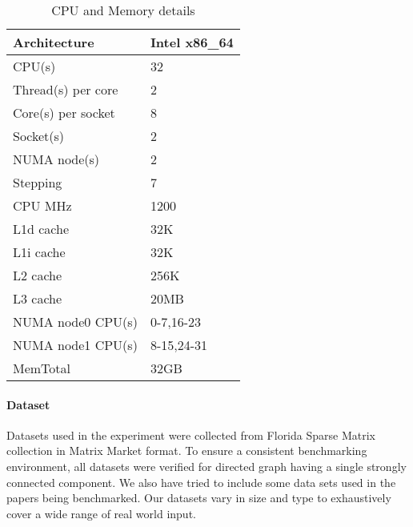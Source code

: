 \begin{table}[th]
\begin{center} %
    \begin{tabular}{| l | l |}
    \hline
    Architecture & Intel x86\_64\\ \hline
    CPU(s) & 32\\ \hline
    Thread(s) per core & 2\\ \hline
	Core(s) per socket & 8\\ \hline
	Socket(s) & 2\\ \hline
	NUMA node(s) & 2\\ \hline
	Stepping & 7\\ \hline
	CPU MHz & 1200\\ \hline
	L1d cache & 32K\\ \hline
	L1i cache & 32K\\ \hline
	L2 cache & 256K\\ \hline
	L3 cache & 20MB\\ \hline
	NUMA node0 CPU(s) & 0-7,16-23\\ \hline
	NUMA node1 CPU(s) & 8-15,24-31\\ \hline
	MemTotal & 32GB\\ \hline
    \end{tabular}
\end{center}
\caption{\capfont CPU and Memory details}
\label{tab:Table1}
\end{table}

\paragraph{Dataset}
Datasets used in the experiment were collected from Florida Sparse
Matrix collection in Matrix Market format.  To ensure a consistent
benchmarking environment, all datasets were verified for directed
graph having a single strongly connected component.  We also have
tried to include some data sets used in the papers being benchmarked.
Our datasets vary in size and type to exhaustively cover a wide range
of real world input.

